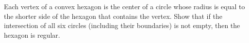 Each vertex of a convex hexagon is the center of a circle whose radius is equal to the shorter side of the hexagon that contains the vertex. Show that if the intersection of all six circles (including their boundaries) is not empty, then the hexagon is regular.